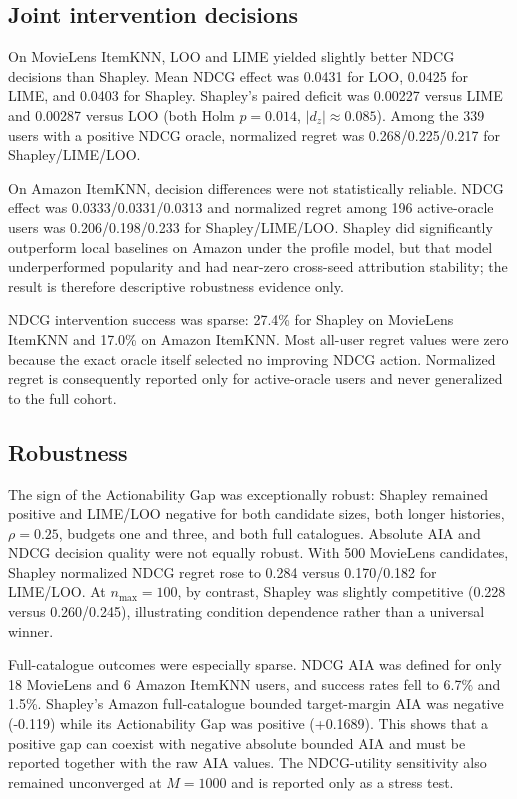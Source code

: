\documentclass[11pt]{article}
\begin{document}
\subsection{Joint intervention decisions}
On MovieLens ItemKNN, LOO and LIME yielded slightly better NDCG decisions than Shapley. Mean NDCG effect was 0.0431 for LOO, 0.0425 for LIME, and 0.0403 for Shapley. Shapley's paired deficit was 0.00227 versus LIME and 0.00287 versus LOO (both Holm $p=0.014$, $|d_z|\approx0.085$). Among the 339 users with a positive NDCG oracle, normalized regret was 0.268/0.225/0.217 for Shapley/LIME/LOO.

On Amazon ItemKNN, decision differences were not statistically reliable. NDCG effect was 0.0333/0.0331/0.0313 and normalized regret among 196 active-oracle users was 0.206/0.198/0.233 for Shapley/LIME/LOO. Shapley did significantly outperform local baselines on Amazon under the profile model, but that model underperformed popularity and had near-zero cross-seed attribution stability; the result is therefore descriptive robustness evidence only.

NDCG intervention success was sparse: 27.4\% for Shapley on MovieLens ItemKNN and 17.0\% on Amazon ItemKNN. Most all-user regret values were zero because the exact oracle itself selected no improving NDCG action. Normalized regret is consequently reported only for active-oracle users and never generalized to the full cohort.

\subsection{Robustness}
The sign of the Actionability Gap was exceptionally robust: Shapley remained positive and LIME/LOO negative for both candidate sizes, both longer histories, $\rho=0.25$, budgets one and three, and both full catalogues. Absolute AIA and NDCG decision quality were not equally robust. With 500 MovieLens candidates, Shapley normalized NDCG regret rose to 0.284 versus 0.170/0.182 for LIME/LOO. At $n_{\max}=100$, by contrast, Shapley was slightly competitive (0.228 versus 0.260/0.245), illustrating condition dependence rather than a universal winner.

Full-catalogue outcomes were especially sparse. NDCG AIA was defined for only 18 MovieLens and 6 Amazon ItemKNN users, and success rates fell to 6.7\% and 1.5\%. Shapley's Amazon full-catalogue bounded target-margin AIA was negative (-0.119) while its Actionability Gap was positive (+0.1689). This shows that a positive gap can coexist with negative absolute bounded AIA and must be reported together with the raw AIA values. The NDCG-utility sensitivity also remained unconverged at $M=1000$ and is reported only as a stress test.
\end{document}
